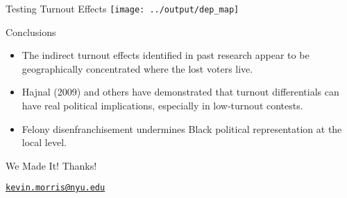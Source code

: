 \documentclass[
  ignorenonframetext,
]{beamer}
\providecommand{\tightlist}{%
  \setlength{\itemsep}{0pt}\setlength{\parskip}{0pt}}
\begin{document}
\begin{frame}{Testing Turnout Effects}
\protect\hypertarget{testing-turnout-effects-3}{}
\texttt{[image: ../output/dep\_map]}
\end{frame}

\begin{frame}{Conclusions}
\protect\hypertarget{conclusions}{}
\begin{itemize}[<+->]
\tightlist
\item
  The indirect turnout effects identified in past research appear to be
  geographically concentrated where the lost voters live.
\end{itemize}

\begin{itemize}[<+->]
\tightlist
\item
  Hajnal (2009) and others have demonstrated that turnout differentials
  can have real political implications, especially in low-turnout
  contests.
\end{itemize}

\begin{itemize}[<+->]
\tightlist
\item
  Felony disenfranchisement undermines Black political representation at
  the local level.
\end{itemize}
\end{frame}

\begin{frame}{We Made It!}
\protect\hypertarget{we-made-it}{}
Thanks!

\href{mailto:kevin.morris@nyu.edu}{\nolinkurl{kevin.morris@nyu.edu}}
\end{frame}
\end{document}

